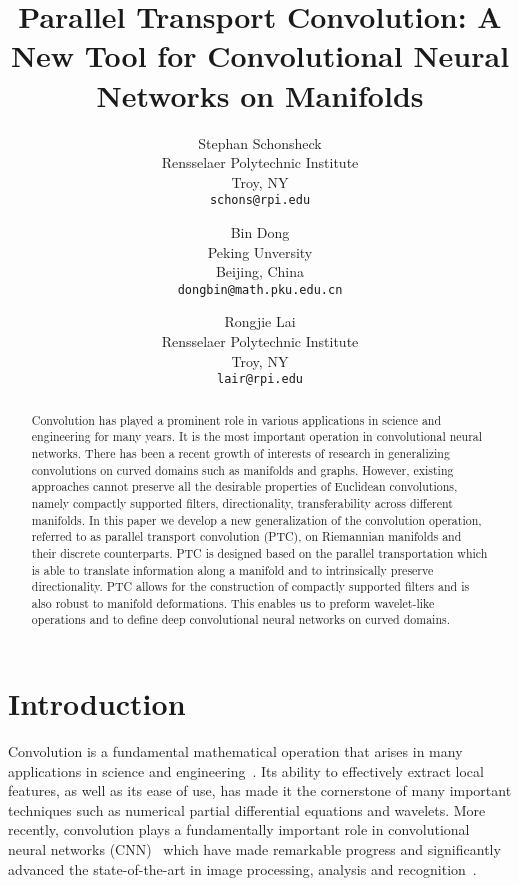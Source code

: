 \documentclass[10pt,twocolumn,letterpaper]{article}
\begin{document}
\date{}
\title{Parallel Transport Convolution: A New Tool for Convolutional Neural Networks on Manifolds}

\author{Stephan Schonsheck\\
Rensselaer Polytechnic Institute\\
Troy, NY\\
{\tt\small schons@rpi.edu}
\and
Bin Dong\\
Peking Unversity\\
Beijing, China\\
{\tt\small dongbin@math.pku.edu.cn}
\and
Rongjie Lai\\
Rensselaer Polytechnic Institute\\
Troy, NY\\
{\tt\small lair@rpi.edu}
}

\maketitle

\begin{abstract}
Convolution has played a prominent role in various applications in science and engineering for many years. It is the most important operation in convolutional neural networks. There has been a recent growth of interests of research in generalizing convolutions on curved domains such as manifolds and graphs. However, existing approaches cannot preserve all the desirable properties of Euclidean convolutions, namely compactly supported filters, directionality, transferability across different manifolds. In this paper we develop a new generalization of the convolution operation, referred to as parallel transport convolution (PTC), on Riemannian manifolds and their discrete counterparts. PTC is designed based on the parallel transportation which is able to translate information along a manifold and to intrinsically preserve directionality. PTC allows for the construction of compactly supported filters and is also robust to manifold deformations. This enables us to preform wavelet-like operations and to define deep convolutional neural networks on curved domains.
\end{abstract}


\section{Introduction}

Convolution is a fundamental mathematical operation that arises in many applications in science and engineering~\cite{Daubechies:1992ten,mallat2008wavelet}. Its ability to effectively extract local features, as well as its ease of use, has made it the cornerstone of many important techniques such as numerical partial differential equations and wavelets. More recently, convolution plays a fundamentally important role in convolutional neural networks (CNN)~\cite{lecun1990handwritten} which have made remarkable progress and significantly advanced the state-of-the-art in image processing, analysis and recognition~\cite{lecun1990handwritten,bengio2015deep,krizhevsky2012imagenet,ciresan2012deep,hinton2012deep,sermanet2013overfeat,leung2014deep,sutskever2014sequence}.
\end{document}
